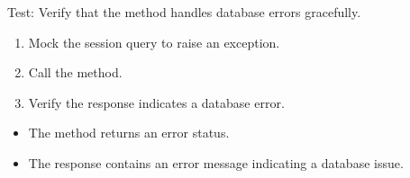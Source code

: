\documentclass[letterpaper,10pt,english]{sphinxmanual}
\begin{document}
\begin{fulllineitems}
\label{\detokenize{test:test.test_alarm.test_list_alarms_database_error}}
\pysigstartsignatures
\pysiglinewithargsret
{}
{\sphinxparamcomma {}}
{}
\pysigstopsignatures
\sphinxAtStartPar
Test: Verify that the method handles database errors gracefully.
\begin{description}
\begin{enumerate}
%
\item {} 
\sphinxAtStartPar
Mock the session query to raise an exception.

\item {} 
\sphinxAtStartPar
Call the  method.

\item {} 
\sphinxAtStartPar
Verify the response indicates a database error.

\end{enumerate}

\begin{itemize}
\item {} 
\sphinxAtStartPar
The method returns an error status.

\item {} 
\sphinxAtStartPar
The response contains an error message indicating a database issue.

\end{itemize}

\end{description}

\end{fulllineitems}

\end{document}
